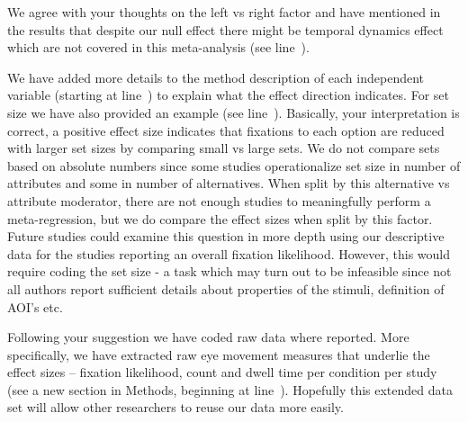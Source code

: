 We agree with your thoughts on the left vs right factor and have mentioned in the results that despite our null effect there might be temporal dynamics effect which are not covered in this meta-analysis (see line~). 



We have added more details to the method description of each independent variable (starting at line~) to explain what the effect direction indicates. For set size we have also provided an example (see line~). Basically, your interpretation is correct, a positive effect size indicates that fixations to each option are reduced with larger set sizes by comparing small vs large sets. We do not compare sets based on absolute numbers since some studies operationalize set size in number of attributes and some in number of alternatives. When split by this alternative vs attribute moderator, there are not enough studies to meaningfully perform a meta-regression, but we do compare the effect sizes when split by this factor. Future studies could examine this question in more depth using our descriptive data for the studies reporting an overall fixation likelihood. However, this would require coding the set size - a task which may turn out to be infeasible since not all authors report sufficient details about properties of the stimuli, definition of AOI's etc. 



Following your suggestion we have coded raw data where reported. More specifically, we have extracted raw eye movement measures that underlie the effect sizes -- fixation likelihood, count and dwell time per condition per study (see a new section in Methods, beginning at line~). Hopefully this extended data set will allow other researchers to reuse our data more easily.\\

